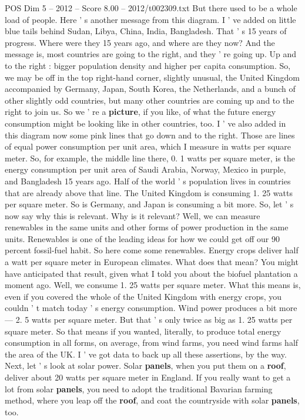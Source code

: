 \begin{textsample}{POS Dim 5 – 2012 – Score 8.00 – 2012/t002309.txt}
But there used to be a whole load of people.
Here ' s another message from this diagram.
I ' ve added on little blue tails behind Sudan, Libya, China, India, Bangladesh.
That ' s 15 years of progress.
Where were they 15 years ago, and where are they now?
And the message is, most countries are going to the right, and they ' re going up.
Up and to the right : bigger population density and higher per capita consumption.
So, we may be off in the top right-hand corner, slightly unusual, the United Kingdom accompanied by Germany, Japan, South Korea, the Netherlands, and a bunch of other slightly odd countries, but many other countries are coming up and to the right to join us.
So we ' re a \textbf{picture}, if you like, of what the future energy consumption might be looking like in other countries, too.
I ' ve also added in this diagram now some pink lines that go down and to the right.
Those are lines of equal power consumption per unit area, which I measure in watts per square meter.
So, for example, the middle line there, 0. 1 watts per square meter, is the energy consumption per unit area of Saudi Arabia, Norway, Mexico in purple, and Bangladesh 15 years ago.
Half of the world ' s population lives in countries that are already above that line.
The United Kingdom is consuming 1. 25 watts per square meter.
So is Germany, and Japan is consuming a bit more.
So, let ' s now say why this is relevant.
Why is it relevant?
Well, we can measure renewables in the same units and other forms of power production in the same units.
Renewables is one of the leading ideas for how we could get off our 90 percent fossil-fuel habit.
So here come some renewables.
Energy crops deliver half a watt per square meter in European climates.
What does that mean?
You might have anticipated that result, given what I told you about the biofuel plantation a moment ago.
Well, we consume 1. 25 watts per square meter.
What this means is, even if you covered the whole of the United Kingdom with energy crops, you couldn ' t match today ' s energy consumption.
Wind power produces a bit more — 2. 5 watts per square meter.
But that ' s only twice as big as 1. 25 watts per square meter.
So that means if you wanted, literally, to produce total energy consumption in all forms, on average, from wind farms, you need wind farms half the area of the UK.
I ' ve got data to back up all these assertions, by the way.
Next, let ' s look at solar power.
Solar \textbf{panels}, when you put them on a \textbf{roof}, deliver about 20 watts per square meter in England.
If you really want to get a lot from solar \textbf{panels}, you need to adopt the traditional Bavarian farming method, where you leap off the \textbf{roof}, and coat the countryside with solar \textbf{panels}, too.

\end{textsample}
